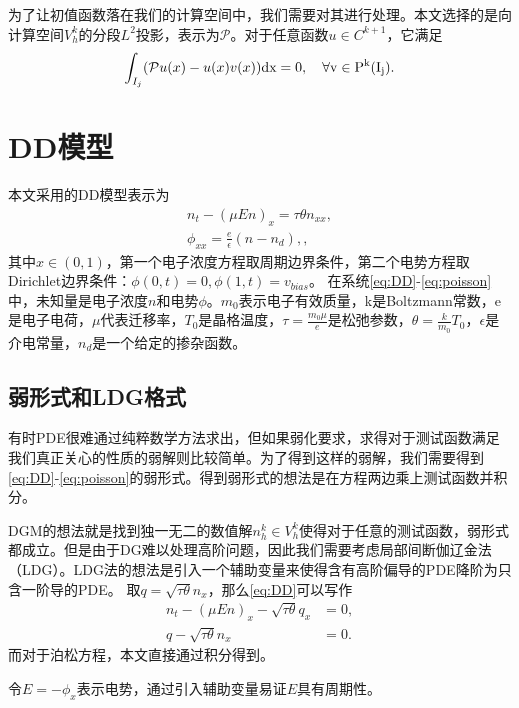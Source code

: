 为了让初值函数落在我们的计算空间中，我们需要对其进行处理。本文选择的是向计算空间$V_h^k$的分段$L^2$投影，表示为$\mathcal{P}$。对于任意函数$u\in C^{k+1}$，它满足
\begin{align}
    \int_{I_j}(\mathcal{P}u(x)-u(x)v(x)) \rm{d}x = 0, \quad \forall v \in P^k(I_j).
\end{align}

\section{DD模型}
本文采用的DD模型表示为
\begin{align}
    n_t - (\mu En)_x = \tau \theta n_{xx}, \label{eq:DD} \\
    \phi_{xx} = \frac{e}{\epsilon}(n - n_d),  \label{eq:poisson},
\end{align}
其中$x\in(0,1)$，第一个电子浓度方程取周期边界条件，第二个电势方程取Dirichlet边界条件：$\phi(0,t) = 0, \phi(1,t) = v_{bias}$。
在系统\eqref{eq:DD}-\eqref{eq:poisson}中，未知量是电子浓度$n$和电势$\phi$。$m_0$表示电子有效质量，k是Boltzmann常数，e是电子电荷，$\mu$代表迁移率，$T_0$是晶格温度，$\tau = \frac{m_0 \mu}{e}$是松弛参数，$\theta = \frac{k}{m_0}T_0$，$\epsilon$是介电常量，$n_d$是一个给定的掺杂函数。

\subsection{弱形式和LDG格式}
有时PDE很难通过纯粹数学方法求出，但如果弱化要求，求得对于测试函数满足我们真正关心的性质的弱解则比较简单。为了得到这样的弱解，我们需要得到\eqref{eq:DD}-\eqref{eq:poisson}的弱形式。得到弱形式的想法是在方程两边乘上测试函数并积分。

DGM的想法就是找到独一无二的数值解$n_h^k\in V_h^k$使得对于任意的测试函数，弱形式都成立。但是由于DG难以处理高阶问题，因此我们需要考虑局部间断伽辽金法（LDG）。LDG法的想法是引入一个辅助变量来使得含有高阶偏导的PDE降阶为只含一阶导的PDE。
取$q = \sqrt{\tau \theta }n_x$，那么\autoref{eq:DD}可以写作
\begin{align}
    n_t - (\mu E n)_x - \sqrt{\tau \theta}q_x & = 0, \label{eq:DD:electronConcentration} \\
    q - \sqrt{\tau \theta}n_x                 & = 0. \label{eq:DD:auxiliaryFunction}
\end{align}
而对于泊松方程，本文直接通过积分得到。

令$E = -\phi_x$表示电势，通过引入辅助变量易证$E$具有周期性\cite{liu2010errorc}。

